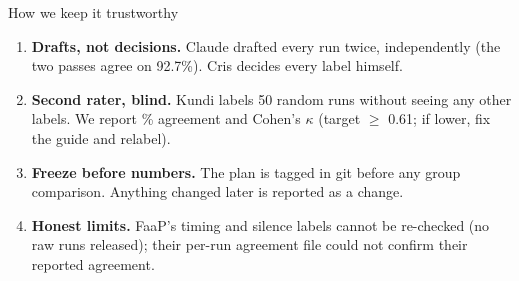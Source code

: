 \documentclass[aspectratio=169,11pt]{beamer}
\begin{document}
\begin{frame}{How we keep it trustworthy}
  \begin{enumerate}
    \item \textbf{Drafts, not decisions.} Claude drafted every run twice, independently
      (the two passes agree on 92.7\%). Cris decides every label himself.
    \item \textbf{Second rater, blind.} Kundi labels 50 random runs without seeing any other labels.
      We report \% agreement and Cohen's $\kappa$ (target $\geq$ 0.61; if lower, fix the guide and relabel).
    \item \textbf{Freeze before numbers.} The plan is tagged in git before any group comparison.
      Anything changed later is reported as a change.
    \item \textbf{Honest limits.} FaaP's timing and silence labels cannot be re-checked (no raw runs released);
      their per-run agreement file could not confirm their reported agreement.
  \end{enumerate}
\end{frame}
\end{document}
